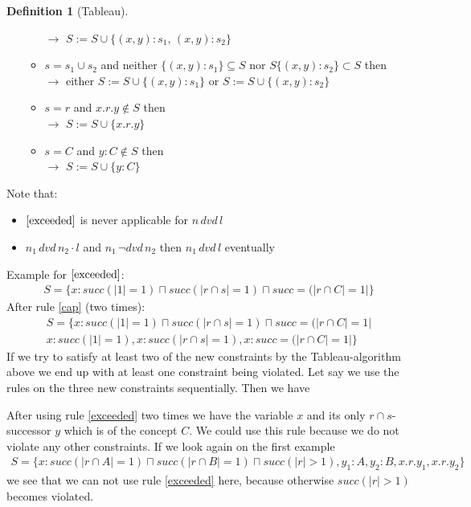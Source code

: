 \documentclass[a4paper,11pt]{scrartcl}
\theoremstyle{definition}
\newtheorem{mydef}{Definition}
\begin{document}
\begin{mydef}[Tableau]
\begin{enumerate}
\begin{itemize}
$\rightarrow$ $S:=S\cup \{(x,y):s_1,\,(x,y):s_2\}$ 
\item $s=s_1\cup s_2$ and neither $\{(x,y):s_1\}\subseteq S$ nor $S\{(x,y):s_2\}\subset S$ then\\
$\rightarrow$ either $S:=S\cup \{(x,y):s_1\}$ or $S:=S\cup \{(x,y):s_2\}$ 
\item $s=r$ and $x.r.y\notin S$ then \\
$\rightarrow$ $S:=S\cup\{x.r.y\}$
\item $s=C$ and $y:C\notin S$ then \\
$\rightarrow$ $S:=S\cup\{y:C\}$
\end{itemize}
\end{enumerate}
\end{mydef}
Note that:
\begin{itemize}
\item $\ref{exceeded}$ is never applicable for $n\, dvd\, l$
\item $n_1\,dvd\,n_2\cdot l$ and $n_1\,\neg dvd\,n_2$ then $n_1\,dvd\,l$ eventually
\end{itemize}
Example for $\ref{exceeded}$:\\
\begin{align*}
S=\{x:succ(|1|=1)\sqcap succ(|r\cap s|=1)\sqcap succ=(|r\cap C|=1|\}
\end{align*}
After rule \ref{cap} (two times):
\begin{align*}
S=\{x:succ(|1|=1)\sqcap succ(|r\cap s|=1)\sqcap succ=(|r\cap C|=1|\\
x:succ(|1|=1), x:succ(|r\cap s|=1), x:succ=(|r\cap C|=1|
\}
\end{align*}
If we try to satisfy at least two of the new constraints by the Tableau-algorithm above we end up with at least one constraint being violated. Let say we use the rules on the three new constraints sequentially. Then we have 
\begin{figure}[H]
\centering
{}
\end{figure}
After using rule \ref{exceeded} two times we have the variable $x$ and its only $r\cap s$-successor $y$ which is of the concept $C$. We could use this rule because we do not violate any other constraints. 
If we look again on the first example
\begin{align*}
S=\{x:succ(|r\cap A|=1)\sqcap succ(|r\cap B|=1)\sqcap succ(|r|>1), y_1:A, y_2:B, x.r.y_1, x.r.y_2\}
\end{align*}
we see that we can not use rule \ref{exceeded} here, because otherwise $succ(|r|>1)$ becomes violated.
\end{document}
